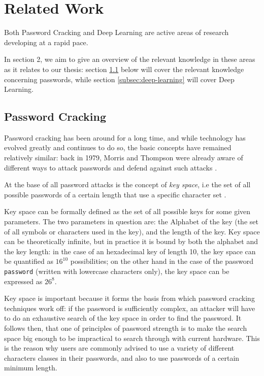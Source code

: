 
\section{Related Work}\label{sec:related_work}
Both Password Cracking and Deep Learning are active areas of research developing at a rapid pace.

In section 2, we aim to give an overview of the relevant knowledge in these areas as it relates to our thesis: section \ref{subsec:password_cracking} below will cover the relevant knowledge concerning passwords, while section \ref{subsec:deep-learning} will cover Deep Learning.

\subsection{Password Cracking}\label{subsec:password_cracking}
Password cracking has been around for a long time, and while technology has evolved greatly and continues to do so, the basic concepts have remained relatively similar:
back in 1979, Morris and Thompson were already aware of different ways to attack passwords and defend against such attacks \cite{Thompson1979}.

At the base of all password attacks is the concept of \emph{key space}, i.e the set of all possible passwords of a certain length that use a specific character set \cite{Thompson1979,hash_cat_mask_attack}. 

Key space can be formally defined as the set of all possible keys for some given parameters. The two parameters in question are: the Alphabet of the key (the set of all symbols or characters used in the key), and the length of the key.
Key space can be theoretically infinite, but in practice it is bound by both the alphabet and the key length: in the case of an hexadecimal key of length 10, the key space can be quantified as $16^{10}$ possibilities; on the other hand in the case of the password \texttt{password} (written with lowercase characters only), the key space can be expressed as $26^8$. %

Key space is important because it forms the basis from which password cracking techniques work off: if the password is sufficiently complex, an attacker will have to do an exhaustive search of the key space in order to find the password. 
It follows then, that one of principles of password strength is to make the search space big enough to be impractical to search through with current hardware.
This is the reason why users are commonly advised to use a variety of different characters classes in their passwords, and also to use passwords of a certain minimum length.

